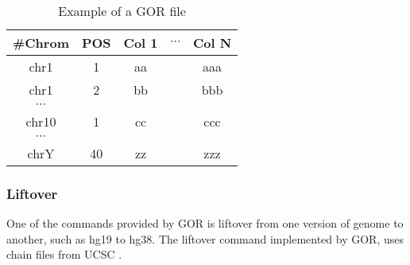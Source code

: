 \begin {table}
    \caption{Example of a GOR file}
    \begin{center}
        \begin{tabular}{ c c c c c} 
             \hline
             \textbf{\#Chrom} &  \textbf{POS} & \textbf{Col 1} & \textbf{$\cdots$} & \textbf{Col N}\\
             \hline
             \hline
             chr1 & 1 & aa & & aaa\\
             chr1 & 2 & bb & & bbb\\
             $\cdots$ & & & & \\
             chr10 & 1 & cc & & ccc \\
             $\cdots$ & & & & \\
             chrY & 40 & zz & & zzz\\
             \hline
        \end{tabular}
    \label{table:gor}
    \end{center}
\end{table}


\subsubsection{Liftover}
One of the commands provided by GOR is liftover from one version of genome to another, such as hg19 to hg38. The liftover command implemented by GOR, uses chain files from UCSC \cite{gudhbjartsson2016gorpipe}.


